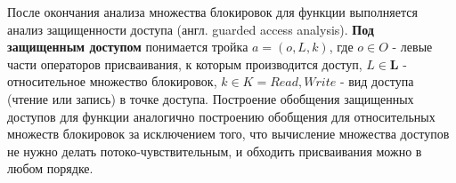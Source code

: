 После окончания анализа множества блокировок для функции выполняется анализ защищенности доступа (англ. guarded access analysis). \textbf{Под защищенным доступом} понимается тройка $a = (o, L, k)$, где $o \in O$ - левые части операторов присваивания, к которым производится доступ, $L \in \mathbf{L}$ - относительное множество блокировок, $k \in K = {Read, Write}$ - вид доступа (чтение или запись) в точке доступа. Построение обобщения защищенных доступов для функции аналогично построению обобщения для относительных множеств блокировок за исключением того, что вычисление множества доступов не нужно делать потоко-чувствительным, и обходить присваивания можно в любом порядке.
